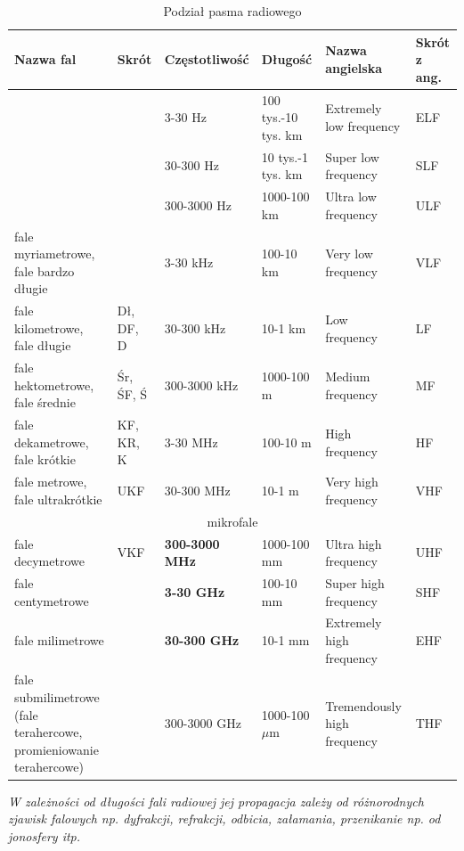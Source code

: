 \begin{table}
\caption{Podział pasma radiowego}
\label{table:radio}
\begin{tabular}{ |p{3cm}|p{1cm}|p{2cm}|p{2cm}|p{2.5cm}|p{1.5cm}|  }
 \hline
Nazwa fal	& Skrót	& Częstotliwość	& Długość	& Nazwa angielska	& Skrót z ang. \\
\hline
\hline
& & 3-30 Hz   & 100 tys.-10 tys. km	& Extremely low frequency	& ELF\\
\hline
& & 30-300 Hz & 10 tys.-1 tys. km	& Super low frequency	    & SLF\\
 \hline
& & 300-3000 Hz & 1000-100 km       & Ultra low frequency	    & ULF\\
 \hline
fale myriametrowe, fale bardzo długie & &	3-30 kHz & 100-10 km & Very low frequency  & VLF\\
\hline
fale kilometrowe, fale długie	& Dł, DF, D & 30-300 kHz & 10-1 km & Low frequency     & LF\\
\hline
fale hektometrowe, fale średnie & Śr, ŚF, Ś & 300-3000 kHz & 1000-100 m  & Medium frequency & MF\\
\hline
fale dekametrowe, fale krótkie  & KF, KR, K	& 3-30 MHz     & 100-10 m    & High frequency           & HF\\
\hline
fale metrowe, fale ultrakrótkie	& UKF	    & 30-300 MHz   & 10-1 m      & Very high frequency      & VHF\\
\hline
\multicolumn{6}{|c|}{mikrofale} \\
\hline
fale decymetrowe	            & VKF       & \textbf{300-3000 MHz} & 1000-100 mm & Ultra high frequency	    & UHF\\
\hline
fale centymetrowe		        &           & \textbf{3-30 GHz}	   & 100-10 mm	 & Super high frequency	    & SHF\\
\hline
fale milimetrowe		        &           & \textbf{30-300 GHz}   & 10-1 mm	 & Extremely high frequency	& EHF\\
\hline
fale submilimetrowe (fale terahercowe, promieniowanie terahercowe) & & 300-3000 GHz & 1000-100 $\mu$m & Tremendously high frequency & THF\\
 \hline
\end{tabular}
\end{table}

\textit{W zależności od długości fali radiowej jej propagacja zależy od różnorodnych zjawisk falowych np. dyfrakcji, refrakcji, odbicia, załamania, przenikanie np. od jonosfery itp.}\cite{FaleRadioweWiki}

